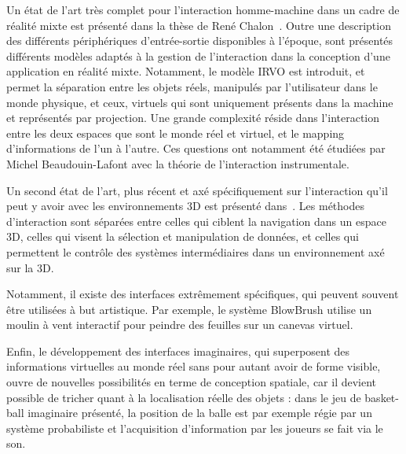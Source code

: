 \documentclass[french,12pt]{article}
\begin{document}
Un état de l'art très complet pour l'interaction homme-machine dans un cadre de réalité mixte est présenté dans la thèse de René Chalon~\cite{chalon_realite_2004}. Outre une description des différents périphériques d'entrée-sortie disponibles à l'époque, sont présentés différents modèles adaptés à la gestion de l'interaction dans la conception d'une application en réalité mixte. Notamment, le modèle IRVO est introduit, et permet la séparation entre les objets réels, manipulés par l'utilisateur dans le monde physique, et ceux, virtuels qui sont uniquement présents dans la machine et représentés par projection. Une grande complexité réside dans l'interaction entre les deux espaces que sont le monde réel et virtuel, et le mapping d'informations de l'un à l'autre. Ces questions ont notamment été étudiées par Michel Beaudouin-Lafont avec la théorie de l'interaction instrumentale.

Un second état de l'art, plus récent et axé spécifiquement sur l'interaction qu'il peut y avoir avec les environnements 3D est présenté dans~\cite{jankowski_advances_2015}. Les méthodes d'interaction sont séparées entre celles qui ciblent la navigation dans un espace 3D, celles qui visent la sélection et manipulation de données, et celles qui permettent le contrôle des systèmes intermédiaires dans un environnement axé sur la 3D. 

Notamment, il existe des interfaces extrêmement spécifiques, qui peuvent souvent être utilisées à but artistique. Par exemple, le système BlowBrush\cite{shen_blowbrush:_2014} utilise un moulin à vent interactif pour peindre des feuilles sur un canevas virtuel.

Enfin, le développement des interfaces imaginaires\cite{gustafson_imaginary_2010}, qui superposent des informations virtuelles au monde réel sans pour autant avoir de forme visible, ouvre de nouvelles possibilités en terme de conception spatiale, car il devient possible de tricher quant à la localisation réelle des objets : dans le jeu de basket-ball imaginaire présenté, la position de la balle est par exemple régie par un système probabiliste et l'acquisition d'information par les joueurs se fait via le son.
\end{document}
